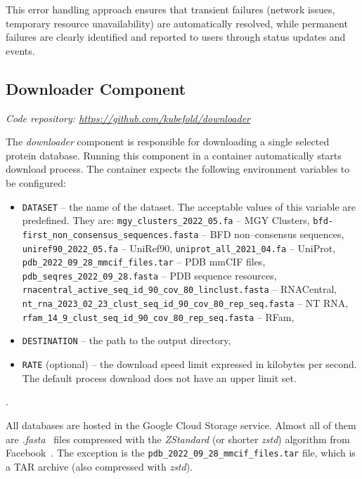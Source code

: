 This error handling approach ensures that transient failures (network issues, temporary resource unavailability) are automatically resolved, while permanent failures are clearly identified and reported to users through status updates and events.

\subsection{Downloader Component}\label{subsec:component-downloader}
\textit{Code repository: \url{https://github.com/kubefold/downloader}}

The \textit{downloader} component is responsible for downloading a single selected protein database.
Running this component in a container automatically starts download process.
The container expects the following environment variables to be configured:

\begin{itemize}
    \item \texttt{DATASET} -- the name of the dataset.
    The acceptable values of this variable are predefined.
    They are:
    \subitem \texttt{mgy\_clusters\_2022\_05.fa} -- MGY Clusters,
    \subitem \texttt{bfd-first\_non\_consensus\_sequences.fasta} -- BFD non--consensus sequences,
    \subitem \texttt{uniref90\_2022\_05.fa} -- UniRef90,
    \subitem \texttt{uniprot\_all\_2021\_04.fa} -- UniProt,
    \subitem \texttt{pdb\_2022\_09\_28\_mmcif\_files.tar} -- PDB mmCIF files,
    \subitem \texttt{pdb\_seqres\_2022\_09\_28.fasta} -- PDB sequence resources,
    \subitem \texttt{rnacentral\_active\_seq\_id\_90\_cov\_80\_linclust.fasta} -- RNACentral,
    \subitem \texttt{nt\_rna\_2023\_02\_23\_clust\_seq\_id\_90\_cov\_80\_rep\_seq.fasta} -- NT RNA,
    \subitem \texttt{rfam\_14\_9\_clust\_seq\_id\_90\_cov\_80\_rep\_seq.fasta} -- RFam,
    \item \texttt{DESTINATION} -- the path to the output directory,
    \item \texttt{RATE} (optional) -- the download speed limit expressed in kilobytes per second.
    The default process download does not have an upper limit set.
\end{itemize}.

All databases are hosted in the Google Cloud Storage service.
Almost all of them are \textit{.fasta}~\cite{pearson1988fasta} files compressed with the \textit{ZStandard} (or shorter \textit{zstd}) algorithm from Facebook~\cite{zstandard}.
The exception is the \texttt{pdb\_2022\_09\_28\_mmcif\_files.tar} file, which is a TAR archive (also compressed with \textit{zstd}).

